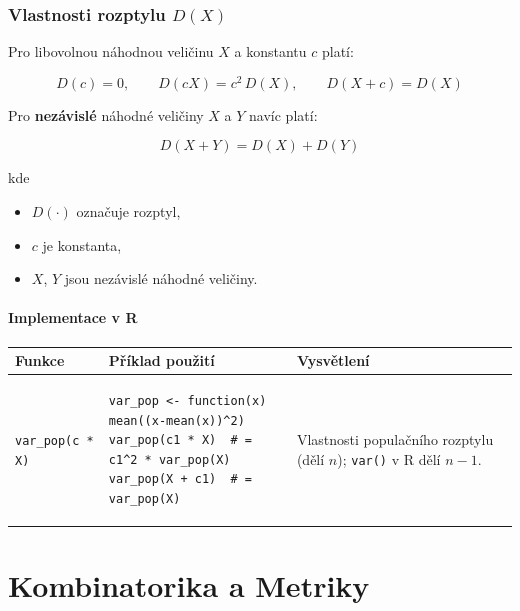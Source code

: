 \documentclass[a4paper, 11pt]{article}
\newenvironment{funkcedict}
{%
  \begingroup
  \renewcommand{\arraystretch}{1.4}%
  \lstset{basicstyle=\ttfamily\small, columns=fullflexible}%
  \setlength{\tabcolsep}{4pt}%
  \begin{tabular}{p{0.19\textwidth} p{0.38\textwidth} p{0.30\textwidth}}
  \textbf{Funkce} & \textbf{Příklad použití} & \textbf{Vysvětlení} \\
  \midrule
}
{%
  \end{tabular}%
  \endgroup
}
\begin{document}
\subsubsection{Vlastnosti rozptylu $D(X)$}

Pro libovolnou náhodnou veličinu $X$ a konstantu $c$ platí:

\begin{equation*}
	D(c) = 0, \qquad D(cX) = c^2\,D(X), \qquad D(X + c) = D(X)
\end{equation*}

Pro \textbf{nezávislé} náhodné veličiny $X$ a $Y$ navíc platí:

\begin{equation*}
	D(X + Y) = D(X) + D(Y)
\end{equation*}

kde

\begin{itemize}[noitemsep]
	\item $D(\cdot)$ označuje rozptyl,
	\item $c$ je konstanta,
	\item $X$, $Y$ jsou nezávislé náhodné veličiny.
\end{itemize}

\paragraph{Implementace v R}\mbox{}\par

\begin{funkcedict}

	\texttt{var\_pop(c * X)} &
	\begin{lstlisting}
var_pop <- function(x) mean((x-mean(x))^2)
var_pop(c1 * X)  # = c1^2 * var_pop(X)
var_pop(X + c1)  # = var_pop(X)
	\end{lstlisting}
	&
	Vlastnosti populačního rozptylu (dělí $n$); \texttt{var()} v R dělí $n-1$. \\

\end{funkcedict}


\clearpage
\section{Kombinatorika a Metriky}
\end{document}
